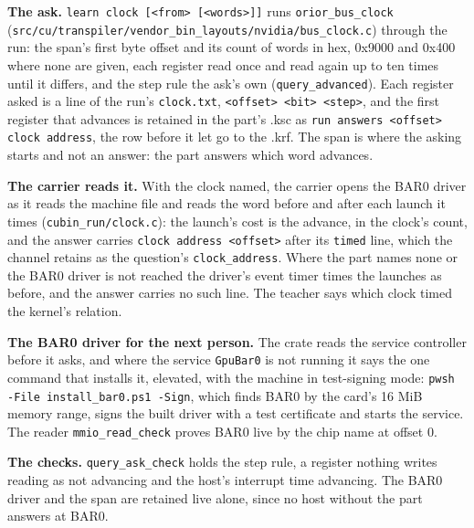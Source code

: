 \textbf{The ask.} \texttt{learn clock [<from> [<words>]]} runs \texttt{orior\_\allowbreak{}bus\_\allowbreak{}clock} (\texttt{src/\allowbreak{}cu/\allowbreak{}transpiler/\allowbreak{}vendor\_\allowbreak{}bin\_\allowbreak{}layouts/\allowbreak{}nvidia/\allowbreak{}bus\_\allowbreak{}clock.\allowbreak{}c}) through the run: the span's first byte offset and its count of words in hex, 0x9000 and 0x400 where none are given, each register read once and read again up to ten times until it differs, and the step rule the ask's own (\texttt{query\_\allowbreak{}advanced}). Each register asked is a line of the run's \texttt{clock.\allowbreak{}txt}, \texttt{<offset> <bit> <step>}, and the first register that advances is retained in the part's .ksc as \texttt{run answers <offset> clock address}, the row before it let go to the .krf. The span is where the asking starts and not an answer: the part answers which word advances.

\textbf{The carrier reads it.} With the clock named, the carrier opens the BAR0 driver as it reads the machine file and reads the word before and after each launch it times (\texttt{cubin\_\allowbreak{}run/\allowbreak{}clock.\allowbreak{}c}): the launch's cost is the advance, in the clock's count, and the answer carries \texttt{clock address <offset>} after its \texttt{timed} line, which the channel retains as the question's \texttt{clock\_\allowbreak{}address}. Where the part names none or the BAR0 driver is not reached the driver's event timer times the launches as before, and the answer carries no such line. The teacher says which clock timed the kernel's relation.

\textbf{The BAR0 driver for the next person.} The crate reads the service controller before it asks, and where the service \texttt{Gpu\allowbreak{}Bar0} is not running it says the one command that installs it, elevated, with the machine in test-signing mode: \texttt{pwsh -\allowbreak{}File install\_\allowbreak{}bar0.\allowbreak{}ps1 -\allowbreak{}Sign}, which finds BAR0 by the card's 16 MiB memory range, signs the built driver with a test certificate and starts the service. The reader \texttt{mmio\_\allowbreak{}read\_\allowbreak{}check} proves BAR0 live by the chip name at offset 0.

\textbf{The checks.} \texttt{query\_\allowbreak{}ask\_\allowbreak{}check} holds the step rule, a register nothing writes reading as not advancing and the host's interrupt time advancing. The BAR0 driver and the span are retained live alone, since no host without the part answers at BAR0.


